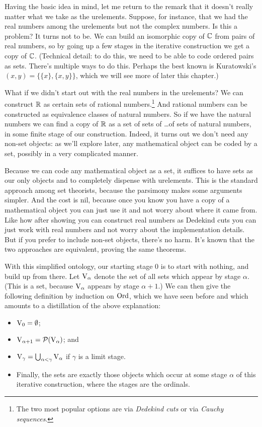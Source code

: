 \documentclass[10pt]{amsart}
\begin{document}
Having the basic idea in mind, let me return to the remark that it doesn't really matter what we take as the urelements. Suppose, for instance, that we had the real numbers among the urelements but not the complex numbers. Is this a problem? It turns not to be. We can build an isomorphic copy of $\mathbb{C}$ from pairs of real numbers, so by going up a few stages in the iterative construction we get a copy of $\mathbb{C}$. (Technical detail: to do this, we need to be able to code ordered pairs as sets. There's multiple ways to do this. Perhaps the best known is Kuratowski's $(x,y)=\{\{x\},\{x,y\}\}$, which we will see more of later this chapter.)

What if we didn't start out with the real numbers in the urelements? We can construct $\mathbb{R}$ as certain sets of rational numbers.\footnote{The two most popular options are via \emph{Dedekind cuts} or via \emph{Cauchy sequences}.}
And rational numbers can be constructed as equivalence classes of natural numbers. So if we have the natural numbers we can find a copy of $\mathbb{R}$ as a set of sets of \dots of sets of natural numbers, in some finite stage of our construction. Indeed, it turns out we don't need any non-set objects: as we'll explore later, any mathematical object can be coded by a set, possibly in a very complicated manner. 

Because we can code any mathematical object as a set, it suffices to have sets as our only objects and to completely dispense with urelements. This is the standard approach among set theorists, because the parsimony makes some arguments simpler. And the cost is nil, because once you know you have a copy of a mathematical object you can just use it and not worry about where it came from. Like how after showing you can construct real numbers as Dedekind cuts you can just work with real numbers and not worry about the implementation details. But if you prefer to include non-set objects, there's no harm. It's known that the two approaches are equivalent, proving the same theorems. 

With this simplified ontology, our starting stage $0$ is to start with nothing, and build up from there. Let $\mathrm{V}_\alpha$ denote the set of all sets which appear by stage $\alpha$. (This is a set, because $\mathrm{V}_\alpha$ appears by stage $\alpha+1$.) We can then give the following definition by induction on $\mathrm{Ord}$, which we have seen before and which amounts to a distillation of the above explanation:

\begin{itemize}
\item $\mathrm{V}_0 = \emptyset$;

\item $\mathrm{V}_{\alpha+1} = \mathcal P(\mathrm{V}_\alpha)$; and

\item $\mathrm{V}_\gamma = \bigcup_{\alpha < \gamma} \mathrm{V}_\alpha$ if $\gamma$ is a limit stage.

\item Finally, the sets are exactly those objects which occur at some stage $\alpha$ of this iterative construction, where the stages are the ordinals.
\end{itemize}
\end{document}

